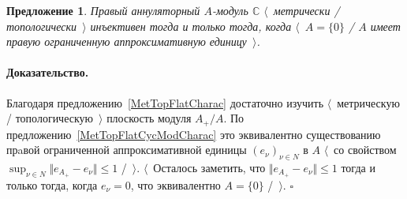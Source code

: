 \documentclass[12pt]{article}
\newtheorem{proposition}[theorem]{Предложение}
\renewenvironment{proof}{\paragraph{Доказательство.}}{\hfill$\square$\medskip}
\begin{document}
\begin{proposition}\label{MetTopInjModCCharac} Правый аннуляторный $A$-модуль
    $\mathbb{C}$ $\langle$~метрически / топологически~$\rangle$ инъективен тогда
    и только тогда, когда $\langle$~$A= \{0 \}$ / $A$  имеет правую ограниченную
    аппроксимативную единицу~$\rangle$.
\end{proposition}
\begin{proof} Благодаря предложению~\ref{MetTopFlatCharac} достаточно изучить
    $\langle$~метрическую / топологическую~$\rangle$ плоскость модуля $A_+/A$.
    По предложению~\ref{MetTopFlatCycModCharac} это эквивалентно существованию
    прaвой ограниченной аппроксимативной единицы ${(e_\nu)}_{\nu\in N}$ в $A$
    $\langle$~со свойством $\sup_{\nu\in N}\Vert e_{A_+}-e_\nu\Vert\leq 1$
    /~$\rangle$. $\langle$~Осталось заметить, что $\Vert e_{A_+}-e_\nu\Vert\leq
        1$ тогда и только тогда, когда $e_\nu=0$, что эквивалентно $A= \{0 \}$
    /~$\rangle$.
\end{proof}
\end{document}
